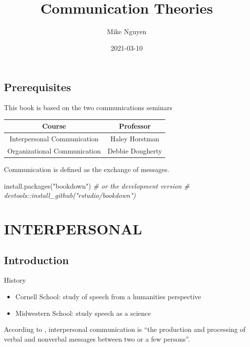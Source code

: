 \documentclass[
]{book}
\title{Communication Theories}
\author{Mike Nguyen}
\date{2021-03-10}
\newenvironment{Shaded}{\begin{snugshade}}{\end{snugshade}}
\newcommand{\CommentTok}[1]{\textcolor[rgb]{0.56,0.35,0.01}{\textit{#1}}}
\newcommand{\FunctionTok}[1]{\textcolor[rgb]{0.00,0.00,0.00}{#1}}
\newcommand{\NormalTok}[1]{#1}
\newcommand{\StringTok}[1]{\textcolor[rgb]{0.31,0.60,0.02}{#1}}
\providecommand{\tightlist}{%
  \setlength{\itemsep}{0pt}\setlength{\parskip}{0pt}}
\begin{document}
\maketitle

{
\setcounter{tocdepth}{1}
\tableofcontents
}
\hypertarget{prerequisites}{%
\chapter{Prerequisites}\label{prerequisites}}

This book is based on the two communications seminars

\begin{longtable}[]{@{}cc@{}}
\toprule
Course & Professor\tabularnewline
\midrule
\endhead
Interpersonal Communication & Haley Horstman\tabularnewline
Organizational Communication & Debbie Dougherty\tabularnewline
\bottomrule
\end{longtable}

Communication is defined as the exchange of messages.

\begin{Shaded}
\begin{Highlighting}[]
\FunctionTok{install.packages}\NormalTok{(}\StringTok{"bookdown"}\NormalTok{)}
\CommentTok{\# or the development version}
\CommentTok{\# devtools::install\_github("rstudio/bookdown")}
\end{Highlighting}
\end{Shaded}

\hypertarget{part-interpersonal}{%
\part{INTERPERSONAL}\label{part-interpersonal}}

\hypertarget{intro}{%
\chapter{Introduction}\label{intro}}

History

\begin{itemize}
\tightlist
\item
  Cornell School: study of speech from a humanities perspective
\item
  Midwestern School: study speech as a science
\end{itemize}

According to \citep{Baxter_2008}, interpersonal communication is ``the production and processing of verbal and nonverbal
messages between two or a few persons''.
\end{document}
